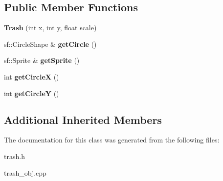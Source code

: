 \subsection*{Public Member Functions}
\begin{DoxyCompactItemize}
\item 
\mbox{\label{class_trash_a8c43bbea8527c8f661b92fc4c51dff10}} 
{\bfseries Trash} (int x, int y, float scale)
\item 
\mbox{\label{class_trash_a3a7569c9c8542a92a484d767244d0718}} 
sf\+::\+Circle\+Shape \& {\bfseries get\+Circle} ()
\item 
\mbox{\label{class_trash_acc41ec490091c10b2052a1666f581d84}} 
sf\+::\+Sprite \& {\bfseries get\+Sprite} ()
\item 
\mbox{\label{class_trash_a26ad6b9e1ee2efe962371263fe2ce8e5}} 
int {\bfseries get\+CircleX} ()
\item 
\mbox{\label{class_trash_a7c412d5f2a659cefb019a1f13f32bab8}} 
int {\bfseries get\+CircleY} ()
\end{DoxyCompactItemize}
\subsection*{Additional Inherited Members}


The documentation for this class was generated from the following files\+:\begin{DoxyCompactItemize}
\item 
trash.\+h\item 
trash\+\_\+obj.\+cpp\end{DoxyCompactItemize}
